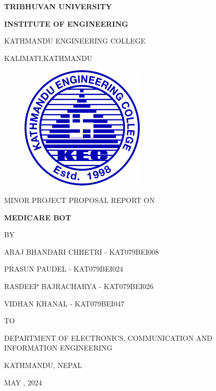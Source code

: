 \begin{titlepage}
    \thispagestyle{empty}
    \begin{center}
    
    \vspace*{\fill} %
    \vspace*{-1cm}
    {\large \textbf{TRIBHUVAN UNIVERSITY
}\par}
{\large \textbf{INSTITUTE OF ENGINEERING
}\par}
\vspace{8pt}
KATHMANDU ENGINEERING COLLEGE

KALIMATI,KATHMANDU
\vspace{24pt}

\begin{figure}[ht]
    \centering
    \includegraphics[scale=0.45]{images/kec.png}
\end{figure}
\vspace{24pt}
{MINOR PROJECT PROPOSAL REPORT ON\par}
\vspace{14pt}

{\textbf{ MEDICARE BOT}\par}



\vspace{14pt}
{BY\par}
\vspace{14pt}

{ ARAJ BHANDARI CHHETRI - KAT079BEI008\par}
{ PRASUN PAUDEL - KAT079BEI024\par}
{RASDEEP BAJRACHARYA - KAT079BEI026\par}
{VIDHAN KHANAL - KAT079BEI047\par}

\vspace{24pt}
{TO\par}
\vspace{14pt}
{DEPARTMENT OF ELECTRONICS, COMMUNICATION AND INFORMATION ENGINEERING\par}
{KATHMANDU, NEPAL\par}
{MAY , 2024\par}


    \end{center}
\end{titlepage}